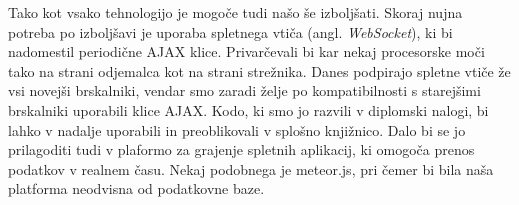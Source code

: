\documentclass[a4paper, 12pt, twoside]{book}
\begin{document}
Tako kot vsako tehnologijo je mogoče tudi našo še izboljšati. Skoraj nujna potreba po izboljšavi je uporaba spletnega vtiča (angl. \textit{WebSocket}), ki bi nadomestil periodične AJAX klice. Privarčevali bi kar nekaj procesorske moči tako na strani odjemalca kot na strani strežnika. Danes podpirajo spletne vtiče že vsi novejši brskalniki, vendar smo zaradi želje po kompatibilnosti s starejšimi brskalniki uporabili klice AJAX. Kodo, ki smo jo razvili v diplomski nalogi, bi lahko v nadalje uporabili in preoblikovali v splošno knjižnico. Dalo bi se jo prilagoditi tudi v plaformo za grajenje spletnih aplikacij, ki omogoča prenos podatkov v realnem času. Nekaj podobnega je meteor.js, pri čemer bi bila naša platforma neodvisna od podatkovne baze.

\end{document}
